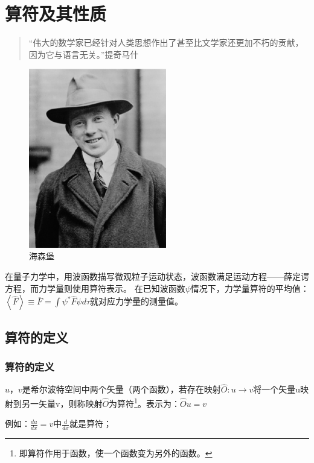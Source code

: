 \section{算符及其性质}

\begin{quotation}
``伟大的数学家已经针对人类思想作出了甚至比文学家还更加不朽的贡献，因为它与语言无关。''\qquad 提奇马什
\end{quotation}

\begin{figure}[h]
\begin{center}
\includegraphics[clip,width=6cm]{Operators/heisenberg.ps}
\caption{海森堡}
\end{center}
\end{figure}

在量子力学中，用波函数描写微观粒子运动状态，波函数满足运动方程——薛定谔方程，而力学量则使用算符表示。
在已知波函数$\psi$情况下，力学量算符的平均值：$\left\langle {\hat F} \right\rangle  \equiv \overline F  = \int {\psi ^* \hat F\psi d\tau } $就对应力学量的测量值。

\subsection{算符的定义}

\subsubsection{算符的定义}

$u$，$v$是希尔波特空间中两个矢量（两个函数），若存在映射$\hat O:u
\to v$将一个矢量u映射到另一矢量v，则称映射$\hat
O$为算符\footnote{即算符作用于函数，使一个函数变为另外的函数。}。表示为：$\hat
Ou = v$

例如：$\frac{{du}}{{dx}} = v$中$\frac{{d}}{{dx}}$就是算符；

